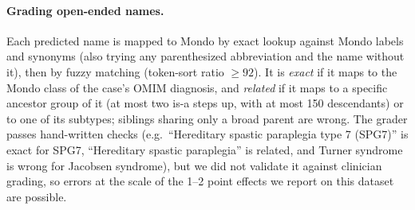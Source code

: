 \documentclass[11pt]{article}
\begin{document}
\paragraph{Grading open-ended names.} Each predicted name is mapped to Mondo by exact lookup against Mondo labels and synonyms (also trying any parenthesized abbreviation and the name without it), then by fuzzy matching (token-sort ratio $\geq 92$). It is \emph{exact} if it maps to the Mondo class of the case's OMIM diagnosis, and \emph{related} if it maps to a specific ancestor group of it (at most two is-a steps up, with at most 150 descendants) or to one of its subtypes; siblings sharing only a broad parent are wrong. The grader passes hand-written checks (e.g.\ ``Hereditary spastic paraplegia type 7 (SPG7)'' is exact for SPG7, ``Hereditary spastic paraplegia'' is related, and Turner syndrome is wrong for Jacobsen syndrome), but we did not validate it against clinician grading, so errors at the scale of the 1--2 point effects we report on this dataset are possible.

\fussy
\end{document}
